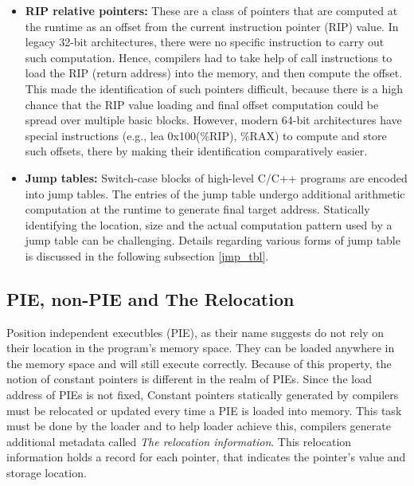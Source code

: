 \begin{itemize}
\begin{itemize}
      \item \textbf{RIP relative pointers:} These are a class of pointers that
        are computed at the runtime as an offset from the current instruction
        pointer (RIP) value. In legacy 32-bit architectures, there were no specific
        instruction to carry out such computation. Hence, compilers had to take
        help of call instructions to load the RIP (return address) into the
        memory, and then compute the offset. This made the identification of
        such pointers difficult, because there is a high chance that the RIP
        value loading and final offset computation could be spread over multiple
        basic blocks. However, modern 64-bit architectures have special
        instructions (e.g., lea 0x100(\%RIP), \%RAX) to compute and store such
        offsets, there by making their identification comparatively easier. 
      \item \textbf{Jump tables:} Switch-case blocks of high-level C/C++
        programs are encoded into jump tables. The entries of the jump table
        undergo additional arithmetic computation at the runtime to generate
        final target address. Statically identifying the location, size and the
        actual computation pattern used by a jump table can be challenging.
        Details regarding various forms of jump table is discussed in the
        following subsection
        \ref{jmp_tbl}. 
    \end{itemize}

\end{itemize}

\subsection{PIE, non-PIE and The Relocation}
Position independent executbles (PIE), as their name suggests do not rely on
their location in the program's memory space. They can be loaded anywhere in the
memory space and will still execute correctly. Because of this property, the
notion of constant pointers is different in the realm of PIEs. Since the load
address of PIEs is not fixed, Constant pointers statically generated by
compilers must be relocated or updated every time a PIE is loaded into memory.
This task must be done by the loader and to help loader achieve this, compilers
generate additional metadata called \textit{The relocation information}. This
relocation information holds a record for each pointer, that indicates the
pointer's value and storage location.


